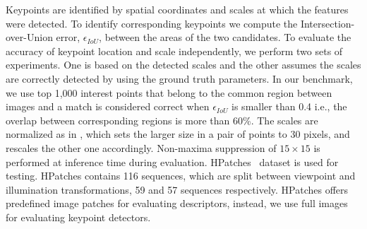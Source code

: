 Keypoints are identified by spatial coordinates and scales at which the features were detected.  To identify corresponding keypoints we compute the Intersection-over-Union error, $\epsilon_{IoU}$, between the areas of the two candidates. To evaluate the accuracy of keypoint location and scale independently, we perform two sets of experiments. One is based on the detected scales and the other assumes the scales are correctly detected by using the ground truth parameters. In our benchmark, we use top 1,000 interest points that belong to the common region between images and a match is considered correct when $\epsilon_{IoU}$ is smaller than 0.4 i.e., the overlap between corresponding regions is more than 60\%. The scales are normalized as in \cite{Karel_Vedaldi_BMVC_18}, which sets the larger size in a pair of points to 30 pixels, and rescales the other one accordingly. Non-maxima suppression of $15 \times 15$ is performed at inference time during evaluation. HPatches~\cite{HPatches} dataset is used for testing. HPatches contains 116 sequences, which are split between viewpoint and illumination transformations, 59 and 57 sequences respectively. HPatches offers predefined image patches for evaluating descriptors, instead, we use full images for evaluating keypoint detectors. 


